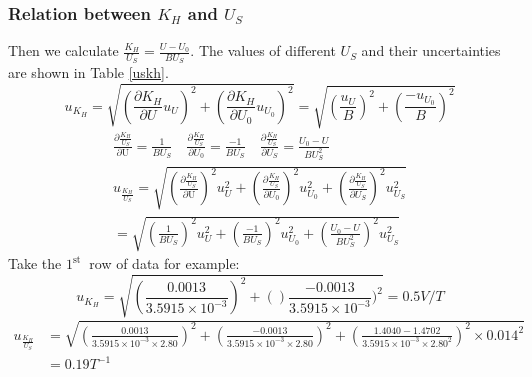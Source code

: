 \documentclass[12pt,a4paper]{article}
\begin{document}
\subsubsection{Relation between $K_H$ and $U_S$}
Then we calculate $\frac{K_H}{U_S}=\frac{U-U_0}{BU_S}$. The values of different $U_S$ and their uncertainties are shown in Table \ref{uskh}.
$$
u_{K_{H}}=\sqrt{\left(\frac{\partial K_{H}}{\partial U} u_{U}\right)^{2}+\left(\frac{\partial K_{H}}{\partial U_{0}} u_{U_{0}}\right)^{2}}=\sqrt{\left(\frac{u_{U}}{B}\right)^{2}+\left(\frac{-u_{U_{0}}}{B}\right)^{2}}
$$
$$
\begin{array}{c}
\frac{\partial \frac{K_{H}}{U_{S}}}{\partial \mathrm{U}}=\frac{1}{B U_{S}} \quad \frac{\partial \frac{K_{H}}{U_{S}}}{\partial U_{0}}=\frac{-1}{B U_{S}} \quad \frac{\partial \frac{K_{H}}{U_{S}}}{\partial U_{S}}=\frac{U_{0}-U}{B U_{S}^{2}} \\
u_{\frac{K_{H}}{U_{S}}}=\sqrt{\left(\frac{\partial \frac{K_{H}}{U_{S}}}{\partial \mathrm{U}}\right)^{2} u_{U}^{2}+\left(\frac{\partial \frac{K_{H}}{U_{S}}}{\partial U_{0}}\right)^{2} u_{U_{0}}^{2}+\left(\frac{\partial \frac{K_{H}}{U_{S}}}{\partial U_{S}}\right)^{2} u_{U_{S}}^{2}} \\
=\sqrt{\left(\frac{1}{B U_{S}}\right)^{2} u_{U}^{2}+\left(\frac{-1}{B U_{S}}\right)^{2} u_{U_{0}}^{2}+\left(\frac{U_{0}-U}{B U_{S}^{2}}\right)^{2} u_{U_{S}}^{2}}
\end{array}
$$
Take the $1^{\text {st }}$ row of data for example:
$$
u_{K_{H}}=\sqrt{(\frac{0.0013}{3.5915 \times 10^{-3}})^2+()\frac{-0.0013}{3.5915 \times 10^{-3}})^2}=0.5V/T
$$
\begin{align*}
    u_{\frac{K_{H}}{U_{S}}}&=\sqrt{\left(\frac{0.0013}{3.5915 \times 10^{-3} \times 2.80}\right)^{2}+\left(\frac{-0.0013}{3.5915 \times 10^{-3} \times 2.80}\right)^{2}+\left(\frac{1.4040-1.4702}{3.5915 \times 10^{-3} \times 2.80^{2}}\right)^{2} \times 0.014^{2}} \\
    &=0.19T^{-1}
\end{align*}
\end{document}

